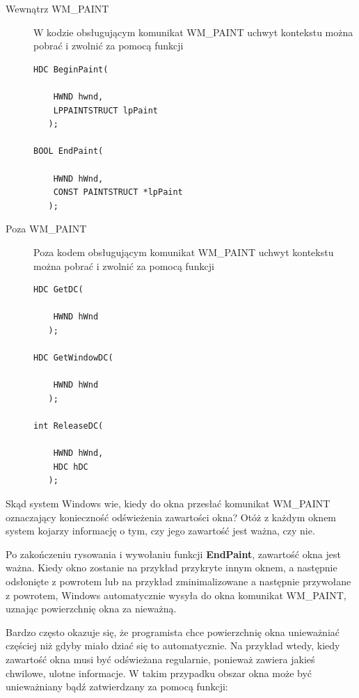 \begin{description}
\item[Wewnątrz WM\_PAINT] W kodzie obsługującym komunikat WM\_PAINT uchwyt kontekstu 
	można pobrać i zwolnić za pomocą funkcji
\begin{scriptsize}
\begin{verbatim}
HDC BeginPaint(

    HWND hwnd,	
    LPPAINTSTRUCT lpPaint	
   );	

BOOL EndPaint(

    HWND hWnd,	
    CONST PAINTSTRUCT *lpPaint 	
   );
\end{verbatim}
\end{scriptsize}

\item[Poza WM\_PAINT] Poza kodem obsługującym komunikat WM\_PAINT uchwyt kontekstu 
	można pobrać i zwolnić za pomocą funkcji
\begin{scriptsize}
\begin{verbatim}
HDC GetDC(

    HWND hWnd 	
   );	

HDC GetWindowDC(

    HWND hWnd 	
   );

int ReleaseDC(

    HWND hWnd,	
    HDC hDC 	
   );	
\end{verbatim}
\end{scriptsize}

\end{description}

Skąd system Windows wie, kiedy do okna przesłać komunikat WM\_PAINT oznaczający konieczność
odświeżenia zawartości okna? Otóż z każdym oknem system kojarzy informację o tym, czy jego
zawartość jest ważna, czy nie. 

Po zakończeniu rysowania i wywołaniu funkcji {\bf EndPaint}, zawartość
okna jest ważna. Kiedy okno zostanie na przykład przykryte innym oknem, a następnie odsłonięte z powrotem
lub na przykład zminimalizowane a następnie przywołane z powrotem, Windows automatycznie wysyła do okna komunikat
WM\_PAINT, uznając powierzchnię okna za nieważną.

Bardzo często okazuje się, że programista chce powierzchnię okna unieważniać częściej niż gdyby miało dziać się
to automatycznie. Na przykład wtedy, kiedy zawartość okna musi być odświeżana regularnie, ponieważ zawiera
jakieś chwilowe, ulotne informacje. W takim przypadku obszar okna może być unieważniany 
bądź zatwierdzany za pomocą funkcji:

